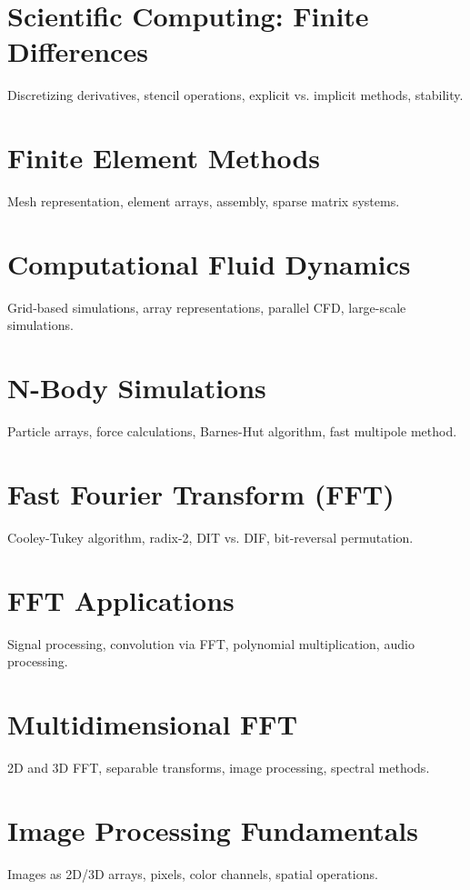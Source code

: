 \chapter{Scientific Computing: Finite Differences}
Discretizing derivatives, stencil operations, explicit vs. implicit methods, stability.

\chapter{Finite Element Methods}
Mesh representation, element arrays, assembly, sparse matrix systems.

\chapter{Computational Fluid Dynamics}
Grid-based simulations, array representations, parallel CFD, large-scale simulations.

\chapter{N-Body Simulations}
Particle arrays, force calculations, Barnes-Hut algorithm, fast multipole method.


\chapter{Fast Fourier Transform (FFT)}
Cooley-Tukey algorithm, radix-2, DIT vs. DIF, bit-reversal permutation.

\chapter{FFT Applications}
Signal processing, convolution via FFT, polynomial multiplication, audio processing.

\chapter{Multidimensional FFT}
2D and 3D FFT, separable transforms, image processing, spectral methods.

\chapter{Image Processing Fundamentals}
Images as 2D/3D arrays, pixels, color channels, spatial operations.

